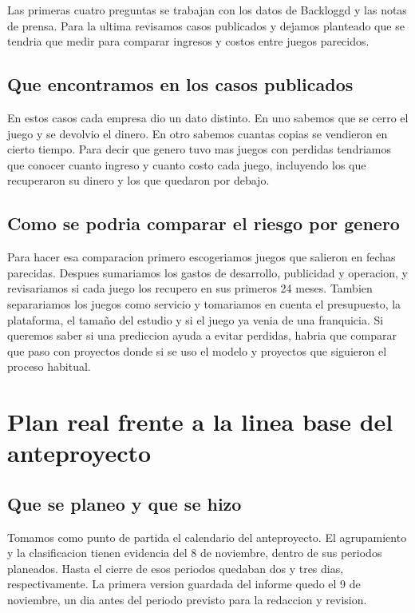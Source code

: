 \documentclass[letterpaper,11pt]{article}
\begin{document}
Las primeras cuatro preguntas se trabajan con los datos de Backloggd y las notas de prensa. Para la ultima revisamos casos publicados y dejamos planteado que se tendria que medir para comparar ingresos y costos entre juegos parecidos.

\subsection{Que encontramos en los casos publicados}
\CasosComerciales

En estos casos cada empresa dio un dato distinto. En uno sabemos que se cerro el juego y se devolvio el dinero. En otro sabemos cuantas copias se vendieron en cierto tiempo. Para decir que genero tuvo mas juegos con perdidas tendriamos que conocer cuanto ingreso y cuanto costo cada juego, incluyendo los que recuperaron su dinero y los que quedaron por debajo.

\subsection{Como se podria comparar el riesgo por genero}
Para hacer esa comparacion primero escogeriamos juegos que salieron en fechas parecidas. Despues sumariamos los gastos de desarrollo, publicidad y operacion, y revisariamos si cada juego los recupero en sus primeros 24 meses. Tambien separariamos los juegos como servicio y tomariamos en cuenta el presupuesto, la plataforma, el tamaño del estudio y si el juego ya venia de una franquicia. Si queremos saber si una prediccion ayuda a evitar perdidas, habria que comparar que paso con proyectos donde si se uso el modelo y proyectos que siguieron el proceso habitual.

\section{Plan real frente a la linea base del anteproyecto}
\subsection{Que se planeo y que se hizo}
Tomamos como punto de partida el calendario del anteproyecto. El agrupamiento y la clasificacion tienen evidencia del 8 de noviembre, dentro de sus periodos planeados. Hasta el cierre de esos periodos quedaban dos y tres dias, respectivamente. La primera version guardada del informe quedo el 9 de noviembre, un dia antes del periodo previsto para la redaccion y revision.
\end{document}
